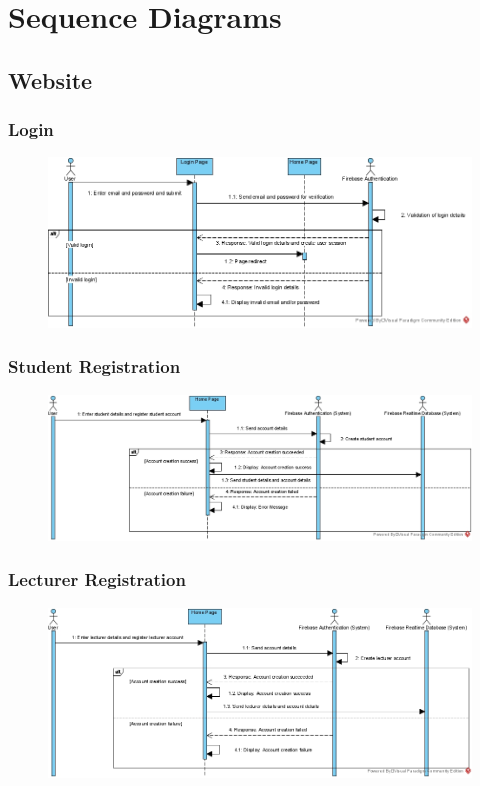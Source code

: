 \documentclass[../report.tex]{subfiles}
\begin{document}
\section{Sequence Diagrams}
\subsection{Website}
\subsubsection{Login}
\begin{figure}[H]
\centering
\includegraphics[width=\textwidth]{./images/05/07-web-login.png}
\label{fig:web-login-seq}
\end{figure}

\subsubsection{Student Registration}
\begin{figure}[H]
\centering
\includegraphics[width=\textwidth]{./images/05/07-web-student-reg.png}
\label{fig:web-student-seq}
\end{figure}

\subsubsection{Lecturer Registration}
\begin{figure}[H]
\centering
\includegraphics[width=\textwidth]{./images/05/07-web-lec-reg.png}
\label{fig:web-lec-seq}
\end{figure}
\end{document}
